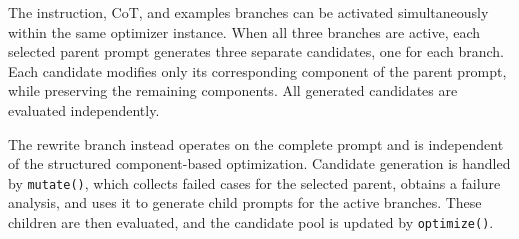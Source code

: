 \documentclass[pdflatex,sn-mathphys-num]{sn-jnl}%
\theoremstyle{thmstyleone}%
\theoremstyle{thmstyletwo}%
\theoremstyle{thmstylethree}%
\begin{document}
The instruction, CoT, and examples branches can be activated
simultaneously within the same optimizer instance. When all
three branches are active, each selected parent prompt generates
three separate candidates, one for each branch. Each candidate
modifies only its corresponding component of the parent prompt,
while preserving the remaining components. All generated
candidates are evaluated independently.

The rewrite branch instead operates on the complete prompt and is
independent of the structured component-based optimization. Candidate
generation is handled by \texttt{mutate()}, which collects failed cases for
the selected parent, obtains a failure analysis, and uses it to generate
child prompts for the active branches. These children are then evaluated,
and the candidate pool is updated by \texttt{optimize()}.


  
  
  
  
  
  
\end{document}
